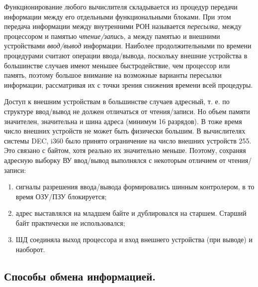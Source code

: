 \documentclass[unicode, 12pt, a4paper, oneside]{article}
\begin{document}
Функционирование любого вычислителя складывается из процедур передачи информации между его отдельными функциональными блоками. При этом передача информации между внутренними РОН называется \textit{пересылка}, между процессором и памятью \textit{чтение/запись}, а между памятью и внешними устройствами \textit{ввод/вывод} информации. Наиболее продолжительными по времени процедурами считают операции ввода/вывода, поскольку внешние устройства в большинстве случаев имеют меньшее быстродействие, чем процессор или память, поэтому большое внимание на возможные варианты пересылки информации, рассматривая их с точки зрения снижения времени всей процедуры.

Доступ к внешним устройствам в большинстве случаев адресный, т. е. по структуре ввод/вывод не должен отличаться от чтения/записи. Но объем памяти значителен, значительна и шина адреса (минимум 16 разрядов). В тоже время число внешних устройств не может быть физически большим. В вычислителях системы DEC, i360 было принято ограничение на число внешних устройств 255. Это связано с байтом, хотя реально их значительно меньше. Поэтому, сохраняя адресную выборку ВУ ввод/вывод выполнялся с некоторым отличием  от чтения/записи:
\begin{enumerate}
\item сигналы разрешения ввода/вывода формировались шинным контролером, в то время ОЗУ/ПЗУ блокируется;
\item адрес выставлялся на младшем байте и дублировался на старшем. Старший байт практически не использовался;
\item ШД соединяла выход процессора и вход внешнего устройства (при выводе) и наоборот.
\end{enumerate}

\subsection*{Способы обмена информацией.}
\end{document}

